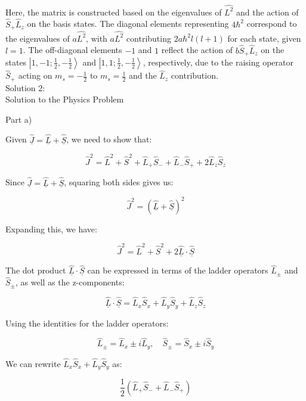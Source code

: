 \documentclass[a4paper,11pt]{article}
\begin{document}
Here, the matrix is constructed based on the eigenvalues of \( \hat{L^{2}} \) and the action of \( \hat{S}_{+}\hat{L}_{z} \) on the basis states. The diagonal elements representing \( 4\hbar^2 \) correspond to the eigenvalues of \( a\hat{L^{2}} \), with \( a\hat{L^{2}} \) contributing \( 2a\hbar^2 l(l+1) \) for each state, given \( l=1 \). The off-diagonal elements \( -1 \) and \( 1 \) reflect the action of \( b\hat{S}_{+}\hat{L}_{z} \) on the states \( \left|1, -1; \frac{1}{2}, -\frac{1}{2} \right> \) and \( \left|1, 1; \frac{1}{2}, -\frac{1}{2} \right> \), respectively, due to the raising operator \( \hat{S}_{+} \) acting on \( m_{s} = -\frac{1}{2} \) to \( m_{s} = \frac{1}{2} \) and the \( \hat{L}_{z} \) contribution. \\

\noindent Solution 2: \\

Solution to the Physics Problem

Part a)

Given \( \hat{\underline{J}} = \hat{\underline{L}} + \hat{\underline{S}} \), we need to show that:

\[
\hat{J}^2 = \hat{L}^2 + \hat{S}^2 + \hat{L}_{+}\hat{S}_{-} + \hat{L}_{-}\hat{S}_{+} + 2\hat{L}_{z}\hat{S}_{z}
\]

Since \( \hat{\underline{J}} = \hat{\underline{L}} + \hat{\underline{S}} \), squaring both sides gives us:

\[
\hat{J}^2 = (\hat{\underline{L}} + \hat{\underline{S}})^2
\]

Expanding this, we have:

\[
\hat{J}^2 = \hat{L}^2 + \hat{S}^2 + 2\hat{\underline{L}}\cdot\hat{\underline{S}}
\]

The dot product \( \hat{\underline{L}}\cdot\hat{\underline{S}} \) can be expressed in terms of the ladder operators \( \hat{L}_{\pm} \) and \( \hat{S}_{\pm} \), as well as the z-components:

\[
\hat{\underline{L}}\cdot\hat{\underline{S}} = \hat{L}_{x}\hat{S}_{x} + \hat{L}_{y}\hat{S}_{y} + \hat{L}_{z}\hat{S}_{z}
\]

Using the identities for the ladder operators:

\[
\hat{L}_{\pm} = \hat{L}_{x} \pm i\hat{L}_{y}, \quad \hat{S}_{\pm} = \hat{S}_{x} \pm i\hat{S}_{y}
\]

We can rewrite \( \hat{L}_{x}\hat{S}_{x} + \hat{L}_{y}\hat{S}_{y} \) as:

\[
\frac{1}{2}(\hat{L}_{+}\hat{S}_{-} + \hat{L}_{-}\hat{S}_{+})
\]
\end{document}
